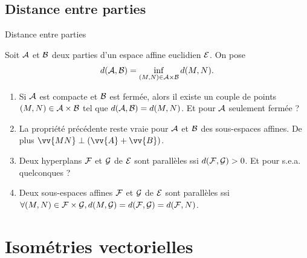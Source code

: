 \documentclass[bigger]{m53beamer}
\begin{document}
\subsection{Distance entre parties}
\begin{frame}{Distance entre parties}
  \begin{definition}
    Soit $\mathcal{A}$ et $\mathcal{B}$ deux parties d'un espace affine euclidien $\mathcal{E}$.
    On pose\forsimple{\vspace*{-.7\baselineskip}}
    \[
      d(\mathcal{A},\mathcal{B}) = \inf_{(M,N) \in \mathcal{A}\times\mathcal{B}}d(M,N).
    \]\forsimple{\vspace*{-.7\baselineskip}}
  \end{definition}
  \begin{enumerate}[<+(1)->]
    \item Si $\mathcal{A}$ est compacte et $\mathcal{B}$ est fermée, alors il existe un couple de points $(M,N) \in \mathcal{A}\times\mathcal{B}$ tel que $d(\mathcal{A},\mathcal{B}) = d(M,N)$. \pause Et pour $\mathcal{A}$ seulement fermée ?
    \item La propriété précédente reste vraie pour $\mathcal{A}$ et $\mathcal{B}$ des sous-espaces affines. De plus $\vv{MN}\perp(\vv{A}+\vv{B})$.
    \item Deux hyperplans $\mathcal{F}$ et $\mathcal{G}$ de $\mathcal{E}$ sont parallèles ssi $d(\mathcal{F},\mathcal{G}) > 0$. \pause Et pour s.e.a. quelconques ?
    \item Deux sous-espaces affines $\mathcal{F}$ et $\mathcal{G}$ de $\mathcal{E}$ sont parallèles ssi $\forall (M,N) \in \mathcal{F}\times\mathcal{G}, d(M,\mathcal{G})=d(\mathcal{F},\mathcal{G})=d(\mathcal{F},N)$.
  \end{enumerate}
\end{frame}


\section{Isométries vectorielles}

\end{document}
